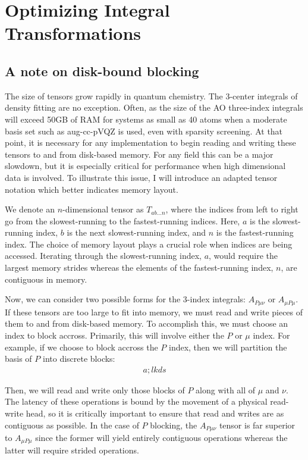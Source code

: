 \chapter{Optimizing Integral Transformations}

\section{A note on disk-bound blocking}

The size of tensors grow rapidly in quantum chemistry.  The 3-center integrals of density fitting are no exception.
Often, as the size of the AO three-index integrals will exceed 50GB of RAM for systems as small as 40 atoms when
a moderate basis set such as aug-cc-pVQZ is used, even with sparsity screening.  At that point, it is necessary for
any implementation to begin reading and writing these tensors to and from disk-based memory. For any field this can
be a major slowdown, but it is especially critical for performance when high dimensional data is involved. To illustrate
this issue, I will introduce an adapted tensor notation which better indicates memory layout.

We denote an $n$-dimensional tensor as $T_{ab\hdots n}$, where the indices from left to right go from the slowest-running
to the fastest-running indices. Here, $a$ is the slowest-running index, $b$ is the next slowest-running
index, and $n$ is the fastest-running index. The choice of memory layout plays a crucial role when indices are being accessed.
Iterating through the slowest-running index, $a$, would require the largest memory strides whereas the elements 
of the fastest-running index, $n$, are contiguous in memory. 

Now, we can consider two possible forms for the 3-index integrals: $A_{P\mu\nu}$ or $A_{\mu P\mu}$.
If these tensors are too large to fit into memory, we must read and write pieces of them to and from disk-based memory.
To accomplish this, we must choose an index to block accross. Primarily, this will involve either the $P$ or $\mu$ index.
For example, if we choose to block accross the $P$ index, then we will partition the basis of $P$ into discrete blocks:
\begin{align}
a;lkds
\end{align}

Then, we will read and write only those blocks of $P$ along with all of $\mu$ and $\nu$. The latency of these operations is
bound by the movement of a physical read-write head, so it is critically important to ensure that read and writes are as
contiguous as possible. In the case of $P$ blocking, the $A_{P\mu\nu}$ tensor is far superior to $A_{\mu P\mu}$ since the 
former will yield entirely contiguous operations whereas the latter will require strided operations.  






